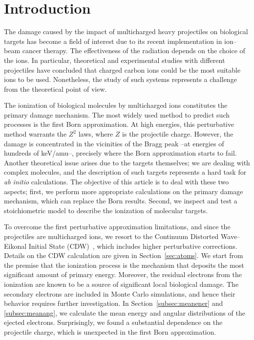 \documentclass[10pt,showpacs,twocolumn]{revtex4}
\begin{document}
\maketitle

\section{Introduction}

The damage caused by the impact of multicharged heavy projectiles on 
biological targets has become a field of interest due to its recent 
implementation in ion--beam cancer therapy. The effectiveness of the 
radiation depends on the choice of the ions. In particular, theoretical 
and experimental studies with different projectiles have concluded that 
charged carbon ions could be the most suitable ions to be used. 
Nonetheless, the study of such systems represents a challenge from the 
theoretical point of view. 

The ionization of biological molecules by multicharged ions constitutes 
the primary damage mechanism. The most widely used method to predict
such processes is the first Born approximation. At high energies, this 
perturbative method warrants the $Z^{2}$ laws, where $Z$ is the 
projectile charge. However, the damage is concentrated in the 
vicinities of the Bragg peak --at energies of hundreds of keV/amu--, 
precisely where the Born approximation starts to fail. 
Another theoretical issue arises due to the targets themselves; we are 
dealing with complex molecules, and the description of such targets 
represents a hard task for {\it ab initio} calculations. The objective 
of this article is to deal with these two aspects; first, we perform 
more appropriate calculations on the primary damage mechanism, which can 
replace the Born results. Second, we inspect and test a stoichiometric 
model to describe the ionization of molecular targets.

To overcome the first perturbative approximation limitations, and since 
the projectiles are multicharged ions, we resort to the Continuum 
Distorted Wave--Eikonal Initial State 
(CDW)~\cite{fainstein1988,miraglia2008,miraglia2009}, which includes higher 
perturbative corrections. Details on the CDW calculation are given in 
Section~\ref{sec:atoms}.
We start from the premise that the ionization 
process is the mechanism that deposits the most significant amount of 
primary energy. Moreover, the residual electrons from the ionization 
are known to be a source of significant local biological damage. 
The secondary electrons are included in Monte Carlo simulations, 
and hence their behavior requires further investigation.
In Section~\ref{subsec:meanener} and \ref{subsec:meanang}, we calculate
the mean energy and angular distributions of the ejected electrons. 
Surprisingly, we found a substantial dependence on the projectile charge, 
which is unexpected in the first Born approximation. 
\end{document}
